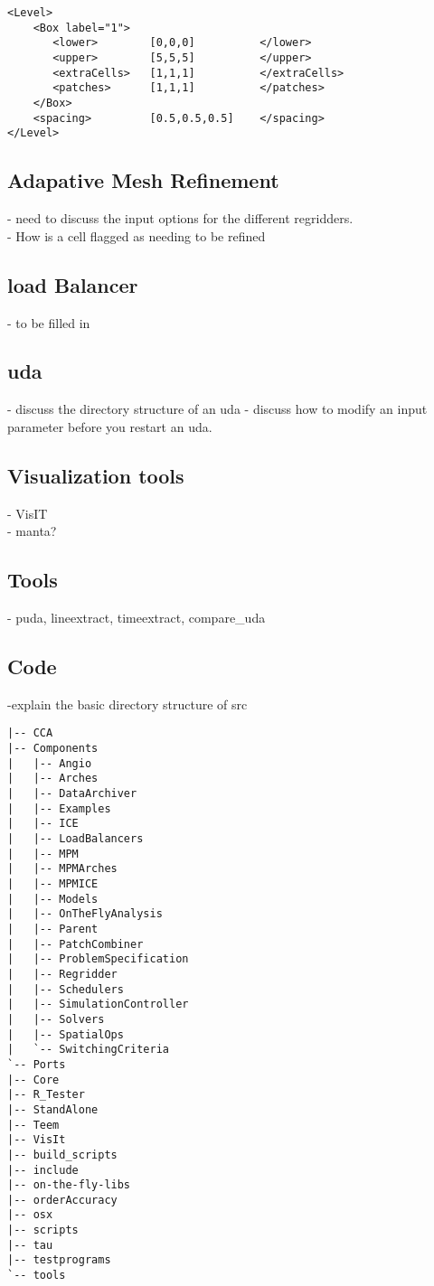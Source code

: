 \begin{Verbatim}[fontsize=\footnotesize]
<Level>
    <Box label="1">
       <lower>        [0,0,0]          </lower>
       <upper>        [5,5,5]          </upper>
       <extraCells>   [1,1,1]          </extraCells>
       <patches>      [1,1,1]          </patches>
    </Box>
    <spacing>         [0.5,0.5,0.5]    </spacing>
</Level>
 \end{Verbatim}
%
\subsection{Adapative Mesh Refinement}
- need to discuss the input options for the different regridders.\\
- How is a cell flagged as needing to be refined
%
\subsection{load Balancer}
- to be filled in

\subsection{uda}
- discuss the directory structure of an uda
- discuss how to modify an input parameter before you restart an uda.

\subsection{Visualization tools}
- VisIT\\
- manta?

\subsection{Tools}
- puda, lineextract, timeextract, compare\_uda\\

\subsection{Code}
-explain the basic directory structure of src
\begin{Verbatim}[fontsize=\footnotesize]
|-- CCA
|-- Components
|   |-- Angio
|   |-- Arches
|   |-- DataArchiver
|   |-- Examples
|   |-- ICE
|   |-- LoadBalancers
|   |-- MPM
|   |-- MPMArches
|   |-- MPMICE
|   |-- Models
|   |-- OnTheFlyAnalysis
|   |-- Parent
|   |-- PatchCombiner
|   |-- ProblemSpecification
|   |-- Regridder
|   |-- Schedulers
|   |-- SimulationController
|   |-- Solvers
|   |-- SpatialOps
|   `-- SwitchingCriteria
`-- Ports
|-- Core
|-- R_Tester
|-- StandAlone
|-- Teem
|-- VisIt
|-- build_scripts
|-- include
|-- on-the-fly-libs
|-- orderAccuracy
|-- osx
|-- scripts
|-- tau
|-- testprograms
`-- tools
\end{Verbatim}
